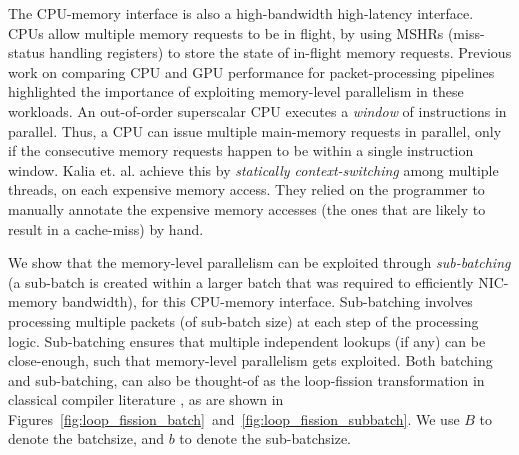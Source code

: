 The CPU-memory interface is also a high-bandwidth high-latency interface. CPUs allow multiple
memory requests to be in flight, by using MSHRs (miss-status handling registers) to store the
state of in-flight memory requests. Previous work on comparing CPU and GPU performance for
packet-processing pipelines \cite{kalia} highlighted the importance of exploiting
memory-level parallelism in these workloads.
An out-of-order superscalar CPU executes a {\em window} of instructions in parallel.
Thus, a CPU can issue multiple main-memory requests in parallel, only if the consecutive memory
requests happen to be within a single instruction window. Kalia et. al. \cite{kalia}
achieve this by {\em statically context-switching} among multiple threads, on each
expensive memory access. They relied on the programmer to manually annotate the expensive
memory accesses (the ones that are likely to result in a cache-miss) by hand.

We show that the memory-level parallelism can be exploited through {\em sub-batching} (a sub-batch
is created within a larger batch that was required to efficiently NIC-memory bandwidth), for this
CPU-memory interface. Sub-batching involves processing multiple packets (of sub-batch size) at
each step of the processing logic.
Sub-batching ensures that multiple independent lookups (if any) can be close-enough, such that
memory-level parallelism gets exploited.
Both batching and sub-batching, can also be thought-of as
the loop-fission transformation in classical compiler literature \cite{loop_fission}, as are
shown in Figures~\ref{fig:loop_fission_batch}~and~\ref{fig:loop_fission_subbatch}. We use $B$
to denote the batchsize, and $b$ to denote the sub-batchsize.

